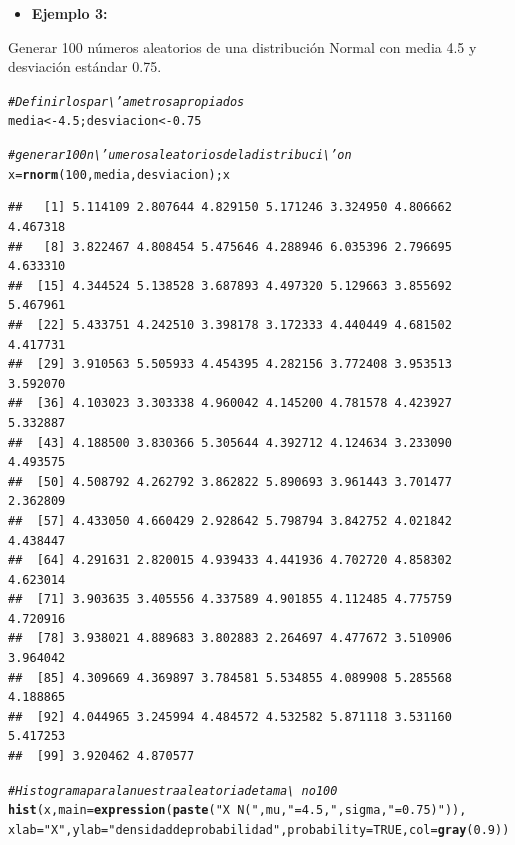 \documentclass[12pt,letterpaper]{article}\usepackage[]{graphicx}\usepackage[]{color}
\makeatletter
\newcommand{\hlnum}[1]{\textcolor[rgb]{0.686,0.059,0.569}{#1}}%
\newcommand{\hlstr}[1]{\textcolor[rgb]{0.192,0.494,0.8}{#1}}%
\newcommand{\hlcom}[1]{\textcolor[rgb]{0.678,0.584,0.686}{\textit{#1}}}%
\newcommand{\hlstd}[1]{\textcolor[rgb]{0.345,0.345,0.345}{#1}}%
\newcommand{\hlkwb}[1]{\textcolor[rgb]{0.69,0.353,0.396}{#1}}%
\newcommand{\hlkwc}[1]{\textcolor[rgb]{0.333,0.667,0.333}{#1}}%
\newcommand{\hlkwd}[1]{\textcolor[rgb]{0.737,0.353,0.396}{\textbf{#1}}}%
\newenvironment{kframe}{%
 \def\at@end@of@kframe{}%
 \ifinner\ifhmode%
  \def\at@end@of@kframe{\end{minipage}}%
  \begin{minipage}{\columnwidth}%
 \fi\fi%
 \def\FrameCommand##1{\hskip\@totalleftmargin \hskip-\fboxsep
 \colorbox{shadecolor}{##1}\hskip-\fboxsep
     \hskip-\linewidth \hskip-\@totalleftmargin \hskip\columnwidth}%
 \MakeFramed {\advance\hsize-\width
   \@totalleftmargin\z@ \linewidth\hsize
   \@setminipage}}%
 {\par\unskip\endMakeFramed%
 \at@end@of@kframe}
\newenvironment{knitrout}{}{} %
\makeatother
\begin{document}
\begin{itemize}
  \item \textbf{Ejemplo 3:}
\end{itemize}
Generar 100 n\'umeros aleatorios de una distribuci\'on Normal con media 4.5 y desviaci\'on est\'andar 0.75.
\begin{knitrout}
\color{fgcolor}\begin{kframe}
\begin{alltt}
\hlcom{# Definir los par\textbackslash{}'ametros apropiados }
\hlstd{media} \hlkwb{<-} \hlnum{4.5}\hlstd{; desviacion} \hlkwb{<-} \hlnum{0.75}

\hlcom{# generar 100 n\textbackslash{}'umeros aleatorios de la distribuci\textbackslash{}'on }
\hlstd{x} \hlkwb{=} \hlkwd{rnorm}\hlstd{(}\hlnum{100}\hlstd{, media, desviacion); x}
\end{alltt}
\begin{verbatim}
##   [1] 5.114109 2.807644 4.829150 5.171246 3.324950 4.806662 4.467318
##   [8] 3.822467 4.808454 5.475646 4.288946 6.035396 2.796695 4.633310
##  [15] 4.344524 5.138528 3.687893 4.497320 5.129663 3.855692 5.467961
##  [22] 5.433751 4.242510 3.398178 3.172333 4.440449 4.681502 4.417731
##  [29] 3.910563 5.505933 4.454395 4.282156 3.772408 3.953513 3.592070
##  [36] 4.103023 3.303338 4.960042 4.145200 4.781578 4.423927 5.332887
##  [43] 4.188500 3.830366 5.305644 4.392712 4.124634 3.233090 4.493575
##  [50] 4.508792 4.262792 3.862822 5.890693 3.961443 3.701477 2.362809
##  [57] 4.433050 4.660429 2.928642 5.798794 3.842752 4.021842 4.438447
##  [64] 4.291631 2.820015 4.939433 4.441936 4.702720 4.858302 4.623014
##  [71] 3.903635 3.405556 4.337589 4.901855 4.112485 4.775759 4.720916
##  [78] 3.938021 4.889683 3.802883 2.264697 4.477672 3.510906 3.964042
##  [85] 4.309669 4.369897 3.784581 5.534855 4.089908 5.285568 4.188865
##  [92] 4.044965 3.245994 4.484572 4.532582 5.871118 3.531160 5.417253
##  [99] 3.920462 4.870577
\end{verbatim}
\begin{alltt}
\hlcom{# Histograma para la nuestra aleatoria de tama\textbackslash{}~no 100 }
\hlkwd{hist}\hlstd{(x,}\hlkwc{main}\hlstd{=}\hlkwd{expression}\hlstd{(}\hlkwd{paste}\hlstd{(}\hlstr{"X ~ N("}\hlstd{, mu,} \hlstr{" = 4.5, "}\hlstd{, sigma,} \hlstr{" = 0.75)"}\hlstd{)),}
\hlkwc{xlab}\hlstd{=}\hlstr{"X"}\hlstd{,} \hlkwc{ylab}\hlstd{=}\hlstr{"densidad de probabilidad"}\hlstd{,} \hlkwc{probability}\hlstd{=}\hlnum{TRUE}\hlstd{,} \hlkwc{col}\hlstd{=}\hlkwd{gray}\hlstd{(}\hlnum{0.9}\hlstd{))}


\end{alltt}
\end{kframe}
\end{knitrout}
\end{document}
